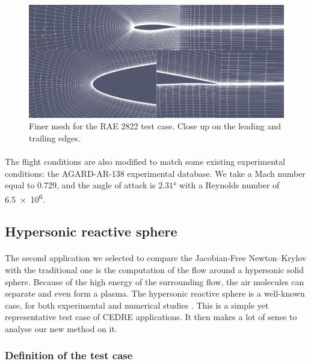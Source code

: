         \begin{figure}
          \centering
          \includegraphics[width=\textwidth]{figures/rae_mesh_fine.png}
          \caption{Finer mesh for the RAE 2822 test case. Close up on the leading and trailing edges.}
          \label{fig:rae_mesh_fine}
        \end{figure}

        \paragraph{}
        The flight conditions are also modified to match some existing experimental conditions: the AGARD-AR-138 experimental database.
        We take a Mach number equal to 0.729, and the angle of attack is $2.31\si{\degree}$ with a Reynolds number of \num{6.5e6}.


    \subsection{Hypersonic reactive sphere}

      \paragraph{}
      The second application we selected to compare the Jacobian-Free Newton--Krylov with the traditional one is the computation of the flow around a hypersonic solid sphere.
      Because of the high energy of the surrounding flow, the air molecules can separate and even form a plasma.
      The hypersonic reactive sphere is a well-known case, for both experimental \cite{Lobb1964} and numerical studies \cite{DobrovGimadievKarpenkoEtAl2022}.
      This is a simple yet representative test case of CEDRE applications.
      It then makes a lot of sense to analyse our new method on it.

      \subsubsection{Definition of the test case}

